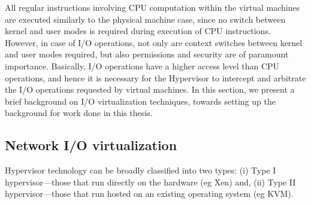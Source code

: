 All regular instructions involving CPU computation within the
virtual machines are executed similarly to the physical machine
case, since no
switch between kernel and user modes is required during execution of
CPU instructions. However, in case of I/O operations, not only are
context switches between kernel and user modes required,
but also permissions and security are of paramount importance.
Basically, I/O operations have a higher access level
than CPU operations, and hence it is necessary for the Hypervisor
to intercept and arbitrate the I/O operations requested 
by virtual machines. In this section, we present 
a brief background on I/O virtualization techniques, towards
setting up the background for work done in this thesis.

\subsection{Network I/O virtualization}
Hypervisor technology can be broadly classified into two types: 
(i) Type I hypervisor---those that run directly on the hardware (eg Xen) and, 
(ii) Type II hypervisor---those that run hosted on an existing operating system (eg KVM).


